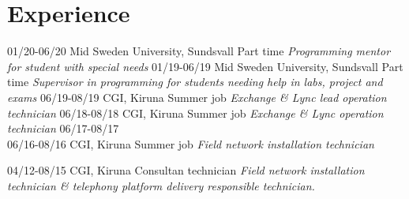 \section{Experience}

\begin{entrylist}
  \entry
    {01/20-06/20}
    {Mid Sweden University, Sundsvall}
    {Part time}
    {\emph{Programming mentor for student with special needs}}
  \entry
    {01/19-06/19}
    {Mid Sweden University, Sundsvall}
    {Part time}
    {\emph{Supervisor in programming for students needing help in labs, project and \\ exams}}
  \entry
    {06/19-08/19}
    {CGI, Kiruna}
    {Summer job}
    {\emph{Exchange \& Lync lead operation technician}}
  \entry
    {06/18-08/18}
    {CGI, Kiruna}
    {Summer job}
    {\emph{Exchange \& Lync operation technician}}
  \entry
    {06/17-08/17 \\ 06/16-08/16}
    {CGI, Kiruna}
    {Summer job}
    {\emph{Field network installation technician}}

  \entry
    {04/12-08/15}
    {CGI, Kiruna}
    {Consultan technician}
    {\emph{Field network installation technician \& telephony platform delivery responsible technician.}}
\end{entrylist}